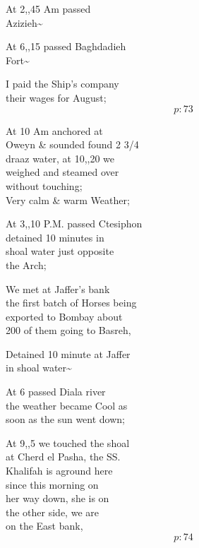 \documentclass{report}
\begin{document}
	\par{
 	At 2,,45 Am passed\ \\Azizieh\~{}\ \\
	}

	\par{
 	At 6,,15 passed Baghdadieh\ \\Fort\~{}\ \\
	}

	\par{
 	I paid the Ship's company\ \\their wages for August;\ \\
  \[p: 73 \]

	}


	\par{
 	At 10 Am anchored at\ \\Oweyn \& sounded found 2 3/4\ \\draaz water, at 10,,20 we\ \\weighed and steamed over\ \\without touching;\ \\Very calm \& warm Weather;\ \\
	}

	\par{
 	At 3,,10 P.M. passed Ctesiphon\ \\detained 10 minutes in\ \\shoal water just opposite\ \\the Arch;\ \\
	}

	\par{
 	We met at Jaffer's bank\ \\the first batch of Horses being\ \\exported to Bombay about\ \\200 of them going to Basreh,\ \\
	}

	\par{
 	Detained 10 minute at Jaffer\ \\in shoal water\~{}\ \\
	}

	\par{
 	At 6 passed Diala river\ \\the weather became Cool as\ \\soon as the sun went down;\ \\
	}

	\par{
 	At 9,,5 we touched the shoal\ \\at Cherd el Pasha, the SS.\ \\Khalifah is aground here\ \\since this morning on\ \\her way down, she is on\ \\the other side, we are\ \\on the East bank,\ \\
  \[p: 74 \]

	}
\end{document}
